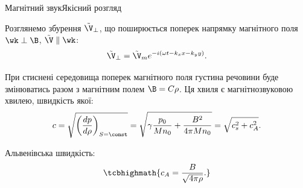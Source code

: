 \documentclass[]{beamer}
\begin{document}
\begin{frame}[t]{Магнітний звук}{Якісний розгляд}
	\begin{block}{}
		Розглянемо збурення $\tilde{\V}_\perp$, що поширюється поперек напрямку магнітного поля $\wk \perp \B$, $\tilde{\V} \parallel \wk$:
		\begin{equation*}
			\tilde{\V}_\perp = \tilde{\V}_m e^{-i(\omega t - k_xx - k_yy)}.
		\end{equation*}
	\end{block}
	\begin{center}
		
	\end{center}
    \vspace*{-2em}
	\begin{overprint}
		\begin{block}{}\justifying
			При стиснені середовища поперек магнітного поля густина речовини буде змінюватись разом з магнітним полем $\B = C\rho$. Ця хвиля є магнітнозвуковою хвилею, швидкість якої:
			\begin{equation*}
				c = \sqrt{\left(\frac{dp}{d\rho}\right)_{S=\const}} = \sqrt{\gamma\frac{p_0}{Mn_0} + \frac{B^2}{4\pi Mn_0}} = \sqrt{c_s^2 + c_A^2}.
			\end{equation*}
		\end{block}
		\begin{block}{}
			Альвенівська швидкість:
			\begin{equation*}
				\tcbhighmath{
					c_A = \frac{B}{\sqrt{4\pi\rho}}.
				}
			\end{equation*}
		\end{block}
	\end{overprint}
\end{frame}
\end{document}
